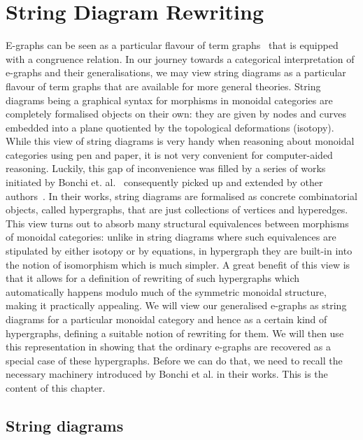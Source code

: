 \chapter{String Diagram Rewriting}\label{chapter:string_diagrams}

E-graphs can be seen as a particular flavour of term graphs~\cite{plump_term,EggsAreAdhesive} that is equipped with a congruence relation.
In our journey towards a categorical interpretation of e-graphs and their generalisations, we may view string diagrams as a particular flavour of term graphs that are available for more general theories.
String diagrams being a graphical syntax for morphisms in monoidal categories are completely formalised objects on their own: they are given by nodes and curves embedded into a plane quotiented by the topological deformations (isotopy).
While this view of string diagrams is very handy when reasoning about monoidal categories using pen and paper, it is not very convenient for computer-aided reasoning.
Luckily, this gap of inconvenience was filled by a series of works initiated by Bonchi et. al.~\cite{bonchi_string_2022-1,bonchi_string_2022-2} consequently picked up and extended by other authors~\cite{zanassi_comonoid,ghica2024stringdiagramslambdacalculifunctional,ghica_rewriting_2023}.
In their works, string diagrams are formalised as concrete combinatorial objects, called hypergraphs, that are just collections of vertices and hyperedges.
This view turns out to absorb many structural equivalences between morphisms of monoidal categories: unlike in string diagrams where such equivalences are stipulated by either isotopy or by equations, in hypergraph they are built-in into the notion of isomorphism which is much simpler.
A great benefit of this view is that it allows for a definition of rewriting of such hypergraphs which automatically happens modulo much of the symmetric monoidal structure, making it practically appealing.
We will view our generalised e-graphs as string diagrams for a particular monoidal category and hence as a certain kind of hypergraphs, defining a suitable notion of rewriting for them.
We will then use this representation in showing that the ordinary e-graphs are recovered as a special case of these hypergraphs.
Before we can do that, we need to recall the necessary machinery introduced by Bonchi et al. in their works.
This is the content of this chapter.

\section{String diagrams}


